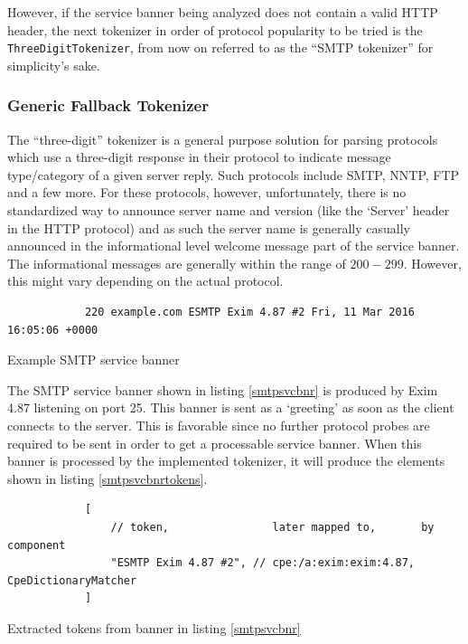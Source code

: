 \documentclass[a4paper,12pt]{article}
\begin{document}
	However, if the service banner being analyzed does not contain a valid HTTP header, the next tokenizer in order of protocol popularity to be tried is the \texttt{ThreeDigitTokenizer}, from now on referred to as the ``SMTP tokenizer'' for simplicity's sake.

\subsubsection{Generic Fallback Tokenizer}
 
	
	The ``three-digit'' tokenizer is a general purpose solution for parsing protocols which use a three-digit response in their protocol to indicate message type/category of a given server reply. Such protocols include SMTP, NNTP, FTP and a few more. For these protocols, however, unfortunately, there is no standardized way to announce server name and version (like the `Server' header in the HTTP protocol) and as such the server name is generally casually announced in the informational level welcome message part of the service banner. The informational messages are generally within the range of $200-299$. However, this might vary depending on the actual protocol.
	
	\begin{listing}[H]
		\begin{verbatim}
			220 example.com ESMTP Exim 4.87 #2 Fri, 11 Mar 2016 16:05:06 +0000
		\end{verbatim}
		\caption{Example SMTP service banner}
		\label{smtpsvcbnr}
	\end{listing}
		
	The SMTP service banner shown in listing \ref{smtpsvcbnr} is produced by Exim 4.87 listening on port 25. This banner is sent as a `greeting' as soon as the client connects to the server. This is favorable since no further protocol probes are required to be sent in order to get a processable service banner. When this banner is processed by the implemented tokenizer, it will produce the elements shown in listing \ref{smtpsvcbnrtokens}.
		
	\begin{listing}[H]
		\begin{verbatim}
			[
				// token,                later mapped to,       by component
				"ESMTP Exim 4.87 #2", // cpe:/a:exim:exim:4.87, CpeDictionaryMatcher
			]
		\end{verbatim}
		\caption{Extracted tokens from banner in listing \ref{smtpsvcbnr}}
		\label{smtpsvcbnrtokens}
	\end{listing}
	
\end{document}
